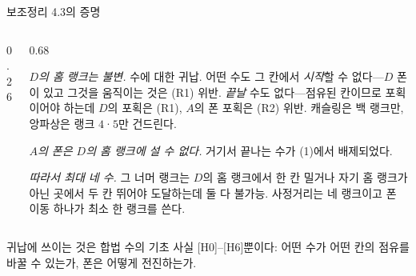 \documentclass[aspectratio=169,10pt]{beamer}
\begin{document}
\begin{frame}{보조정리 4.3의 증명}
  \centering
  \vspace{0.15cm}
  \begin{columns}[c]
    \begin{column}{0.26\textwidth}\centering
      \fighomeranks
    \end{column}
    \begin{column}{0.68\textwidth}
      \begin{lcproof}
        \begin{lcsteps}
          \item \emph{$D$의 홈 랭크는 불변.} 수에 대한 귀납. 어떤 수도 그
            칸에서 \emph{시작}할 수 없다---$D$ 폰이 있고 그것을 움직이는 것은
            (R1) 위반. \emph{끝날} 수도 없다---점유된 칸이므로 포획이어야
            하는데 $D$의 포획은 (R1), $A$의 폰 포획은 (R2) 위반.
            캐슬링은 백 랭크만, 앙파상은 랭크 $4$·$5$만 건드린다.
          \item \emph{$A$의 폰은 $D$의 홈 랭크에 설 수 없다.} 거기서
            끝나는 수가 (1)에서 배제되었다.
          \item \emph{따라서 최대 네 수.} 그 너머 랭크는 $D$의 홈 랭크에서
            한 칸 밀거나 자기 홈 랭크가 아닌 곳에서 두 칸 뛰어야 도달하는데
            둘 다 불가능. 사정거리는 네 랭크이고 폰 이동 하나가 최소 한
            랭크를 쓴다. \qedhere
        \end{lcsteps}
      \end{lcproof}
    \end{column}
  \end{columns}
  \par\vspace{0.15cm}
  {\scriptsize\color{lcgrey}
   귀납에 쓰이는 것은 합법 수의 기초 사실 [H0]--[H6]뿐이다:
   어떤 수가 어떤 칸의 점유를 바꿀 수 있는가, 폰은 어떻게 전진하는가.}
\end{frame}
\end{document}
